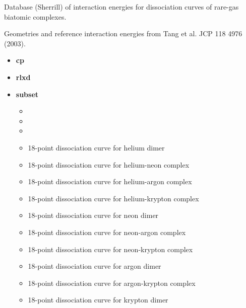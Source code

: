 \documentclass[letterpaper,10pt,english]{sphinxmanual}
\begin{document}
\begin{DUlineblock}{0em}
\item[] Database (Sherrill) of interaction energies for dissociation curves of rare-gas biatomic complexes.
\item[] Geometries and reference interaction energies from Tang et al. JCP 118 4976 (2003).
\end{DUlineblock}
\begin{itemize}
\item {} 
\textbf{cp}   \textbar{}\textbar{} 

\item {} 
\textbf{rlxd} 

\item {} 
\textbf{subset}
\begin{itemize}
\item {} 

\item {} 

\item {} 

\item {} 
 18-point dissociation curve for helium dimer

\item {} 
 18-point dissociation curve for helium-neon complex

\item {} 
 18-point dissociation curve for helium-argon complex

\item {} 
 18-point dissociation curve for helium-krypton complex

\item {} 
 18-point dissociation curve for neon dimer

\item {} 
 18-point dissociation curve for neon-argon complex

\item {} 
 18-point dissociation curve for neon-krypton complex

\item {} 
 18-point dissociation curve for argon dimer

\item {} 
 18-point dissociation curve for argon-krypton complex

\item {} 
 18-point dissociation curve for krypton dimer

\end{itemize}

\end{itemize}
\end{document}
